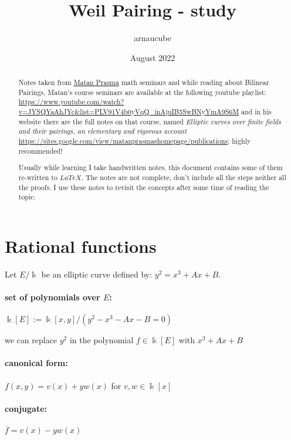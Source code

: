 \documentclass{article}
\title{Weil Pairing - study}
\author{arnaucube}
\date{August 2022}
\theoremstyle{definition}
\begin{document}
\maketitle

\begin{abstract}
  Notes taken from
  \href{https://sites.google.com/view/matanprasmashomepage/publications}{Matan
  Prasma} math seminars and while reading about Bilinear Pairings, Matan's
  course seminars are available at the following youtube playlist:\\
  \href{https://www.youtube.com/watch?v=JYSQYaAhJYc&list=PLV91V4b0yVqQ_inAjuIB5SwBNyYmA9S6M}{https://www.youtube.com/watch?v=JYSQYaAhJYc&list=PLV91V4b0yVqQ_inAjuIB5SwBNyYmA9S6M}
  and in his website there are the full notes on that course, named
  \emph{Elliptic curves over finite fields and their pairings, an elementary and rigorous account}\\
  \href{https://sites.google.com/view/matanprasmashomepage/publications}{https://sites.google.com/view/matanprasmashomepage/publications};
  highly recommended!

  Usually while learning I take handwritten notes, this document contains some of them re-written to $LaTeX$.
  The notes are not complete, don't include all the steps neither all the proofs. I use these notes to revisit the concepts after some time of reading the topic.
\end{abstract}

\tableofcontents

\section{Rational functions}

Let $E/\Bbbk$ be an elliptic curve defined by: $y^2 = x^3 + Ax + B$.

\paragraph{set of polynomials over $E$:}
$\Bbbk[E] := \Bbbk[x,y] / (y^2 - x^3 - Ax - B =0)$

we can replace $y^2$ in the polynomial $f \in \Bbbk[E]$ with $x^3 + Ax + B$

\paragraph{canonical form:} $f(x,y) = v(x)+y w(x)$ for $v, w \in \Bbbk[x]$
\paragraph{conjugate:} $\overline{f} = v(x) - y w(x)$
\end{document}
